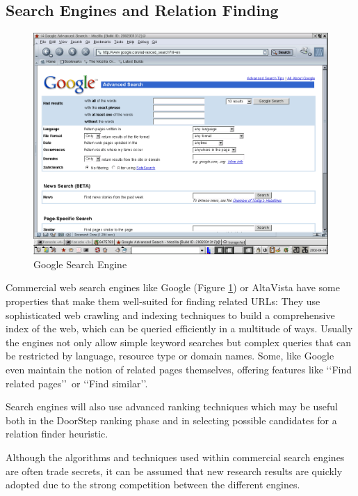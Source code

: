 \documentclass[a4paper]{danarticle}
\theoremstyle{remark}
\begin{document}
     \subsection{Search Engines and Relation Finding}
       \begin{figure}[ht]
         \centering
         \includegraphics[width=12cm]{googleadv}
         \caption{Google Search Engine}
         \label{googleadv}
       \end{figure}
       Commercial web search engines like Google\cite{google} (Figure \ref{googleadv})
       or AltaVista\cite{altavista} have 
       some properties that make them well-suited for finding related URLs: They 
       use sophisticated web crawling and indexing techniques to build a 
       comprehensive index of the web, which can be queried efficiently in 
       a multitude of ways. Usually the engines not only allow simple keyword 
       searches but complex queries that can be restricted by language, 
       resource type or domain names. Some, like Google\cite{google} 
       even maintain the notion of related pages themselves, offering features like 
       \lq\lq Find related pages\rq\rq\ or \lq\lq Find similar\rq\rq . 
  
       Search engines will also use advanced ranking techniques which may be
       useful both in the DoorStep ranking phase and in selecting possible
       candidates for a relation finder heuristic.
       
       Although the algorithms and techniques used within commercial search 
       engines are often trade secrets, it can be assumed 
       that new research results are quickly adopted due to the strong 
       competition between the different engines.
       
\end{document}
